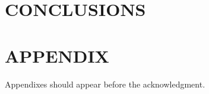 \documentclass[letterpaper, 10 pt, conference]{ieeeconf}  %
\begin{document}
\section{CONCLUSIONS}


\addtolength{\textheight}{-12cm}   %







\section*{APPENDIX}

Appendixes should appear before the acknowledgment.





\end{document}
